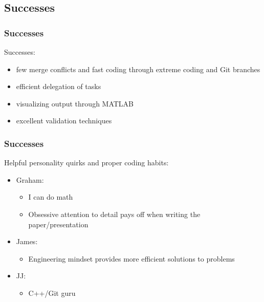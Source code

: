 \documentclass[usernames,dvipsnames]{beamer}
\begin{document}
\subsection{Successes}

\begin{frame}	
	\frametitle{Successes}
	
	\begin{exampleblock}{Successes:}
		\begin{itemize}
		\item few merge conflicts and fast coding through extreme coding and Git branches
		\item efficient delegation of tasks
		\item visualizing output through MATLAB
		\item excellent validation techniques
		\end{itemize}
	\end{exampleblock}

\end{frame}

\begin{frame}	
	\frametitle{Successes}
	
	\begin{exampleblock}{Helpful personality quirks and proper coding habits:}
		\begin{itemize}
			\setlength\itemsep{0.5pt}
			\item Graham: \\
				\begin{itemize}
					\setlength\itemsep{0.5pt}
					\item I can do math
					\item Obsessive attention to detail pays off when writing the paper/presentation
				\end{itemize}
			\item James: \\
				\begin{itemize}
					\setlength\itemsep{0.5pt}
					\item Engineering mindset provides more efficient solutions to problems
				\end{itemize}
			\item JJ: \\
				\begin{itemize}
					\setlength\itemsep{0.5pt}
					\item C++/Git guru
				\end{itemize}
		\end{itemize}
	\end{exampleblock}

\end{frame}
\end{document}
